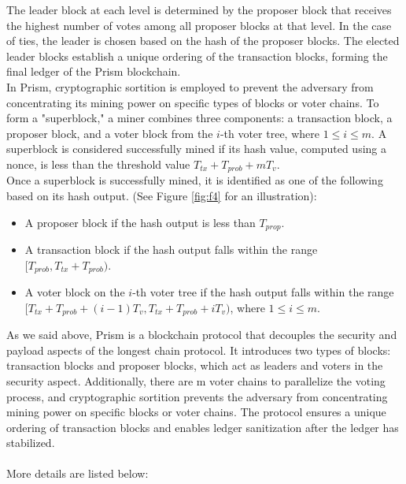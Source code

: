 The leader block at each level is determined by the proposer block that receives the highest number of votes among all proposer blocks at that level. In the case of ties, the leader is chosen based on the hash of the proposer blocks. The elected leader blocks establish a unique ordering of the transaction blocks, forming the final ledger of the Prism blockchain.\\
In Prism, cryptographic sortition is employed to prevent the adversary from concentrating its mining power on specific types of blocks or voter chains. To form a "superblock," a miner combines three components: a transaction block, a proposer block, and a voter block from the $i$-th voter tree, where $1 \leq i \leq m$. A superblock is considered successfully mined if its hash value, computed using a nonce, is less than the threshold value $T_{tx} + T_{prob} + mT_{v}$.\\
Once a superblock is successfully mined, it is identified as one of the following based on its hash output. (See Figure \ref{fig:f4} for an illustration):\\
\begin{itemize}
    \item A proposer block if the hash output is less than $T_{prop}$.
    \item A transaction block if the hash output falls within the range $[T_{prob}, T_{tx} + T_{prob})$.
    \item A voter block on the $i$-th voter tree if the hash output falls within the range $[T_{tx} + T_{prob} + (i − 1)T_{v}, T_{tx} + T_{prob} + iT_{v})$, where $1 \leq i \leq m$.
\end{itemize}
As we said above, Prism is a blockchain protocol that decouples the security and payload aspects of the longest chain protocol. It introduces two types of blocks: transaction blocks and proposer blocks, which act as leaders and voters in the security aspect. Additionally, there are m voter chains to parallelize the voting process, and cryptographic sortition prevents the adversary from concentrating mining power on specific blocks or voter chains. The protocol ensures a unique ordering of transaction blocks and enables ledger sanitization after the ledger has stabilized.\\
\\
More details are listed below:
\\

